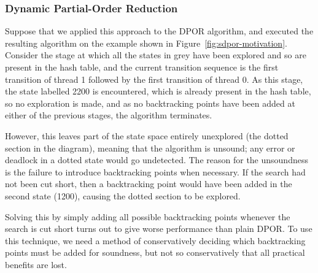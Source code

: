 \documentclass[12pt,a4paper,twoside,openright]{report}
\begin{document}
\subsubsection{Dynamic Partial-Order Reduction}

Suppose that we applied this approach
to the DPOR algorithm,
and executed the resulting algorithm
on the example shown in
Figure~\ref{fig:sdpor-motivation}.
Consider the stage at which
all the states in grey have been
explored and so are present in the hash table,
and the current transition sequence is the first
transition of thread 1 followed by the first
transition of thread 0. As this stage, the state
labelled 2200 is encountered, which is already
present in the hash table, so no exploration is
made, and as no backtracking points have been added
at either of the previous stages, the algorithm
terminates.

However, this leaves part of the state
space entirely unexplored (the dotted section in
the diagram), meaning that the algorithm is unsound;
any error or deadlock in a dotted state would go
undetected.
The reason for the unsoundness is the failure to
introduce backtracking points when necessary. If the
search had not been cut short, then a backtracking point
would have been added in the second state (1200), causing the
dotted section to be explored.

Solving this by simply adding
all possible backtracking points
whenever the search is cut short turns out to
give worse performance than plain DPOR.
To use this technique,
we need a method of conservatively deciding which
backtracking points must be added for soundness, but not
so conservatively that all practical benefits are lost.
\end{document}
